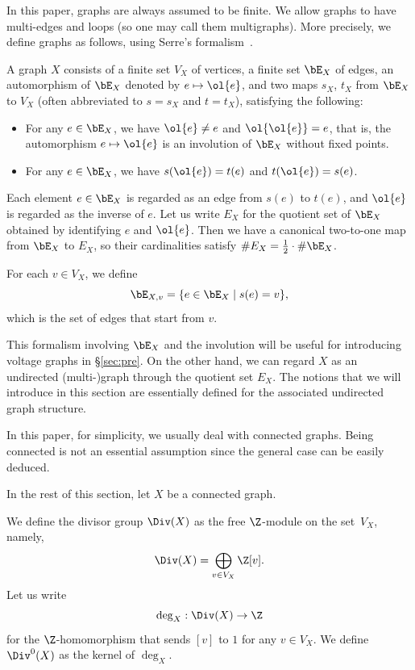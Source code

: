 In this paper, graphs are always assumed to be finite.
We allow graphs to have multi-edges and loops (so one may call them multigraphs).
More precisely, we define graphs as follows, using Serre's formalism~\cite[Chapter I, \S 2.1]{Ser80}.

\begin{defi}
A graph $X$ consists of a finite set $V_X$ of vertices, a finite set $\bE_X$ of edges, an automorphism of $\bE_X$ denoted by $e \mapsto \ol{e}$, and two maps $s_X$, $t_X$ from $\bE_X$ to $V_X$ (often abbreviated to $s = s_X$ and $t = t_X$), satisfying the following:
\begin{itemize}
\item
For any $e \in \bE_X$, we have $\ol{e} \neq e$ and $\ol{\ol{e}} = e$, that is, the automorphism $e \mapsto \ol{e}$ is an involution of $\bE_X$ without fixed points.
\item
For any $e \in \bE_X$, we have $s(\ol{e}) = t(e)$ and $t(\ol{e}) = s(e)$.
\end{itemize}

Each element $e \in \bE_X$ is regarded as an edge from $s(e)$ to $t(e)$, and $\ol{e}$ is regarded as the inverse of $e$.
Let us write $E_X$ for the quotient set of $\bE_X$ obtained by identifying $e$ and $\ol{e}$.
Then we have a canonical two-to-one map from $\bE_X$ to $E_X$, so their cardinalities satisfy $\# E_X = \frac{1}{2} \cdot \# \bE_X$.

For each $v \in V_X$, we define
\[
\bE_{X, v} = \{ e \in \bE_X \mid s(e) = v\},
\]
which is the set of edges that start from $v$.
\end{defi}

This formalism involving $\bE_X$ and the involution will be useful for introducing voltage graphs in \S\ref{sec:pre}.
On the other hand, we can regard $X$ as an undirected \mbox{(multi-)}graph through the quotient set $E_X$.
The notions that we will introduce in this section are essentially defined for the associated undirected graph structure.


In this paper, for simplicity, we usually deal with connected graphs.
Being connected is not an essential assumption since the general case can be easily deduced.

In the rest of this section, let $X$ be a connected graph.

\begin{defi}
We define the divisor group $\Div(X)$ as the free $\Z$-module on the set~$V_X$, namely, 
\[
\Div(X) = \bigoplus_{v \in V_X} \Z [v].
\]
Let us write
\[
\deg_X: \Div(X) \to \Z
\]
for the $\Z$-homomorphism that sends $[v]$ to $1$ for any $v \in V_X$.
We define $\Div^0(X)$ as the kernel of $\deg_X$.
\end{defi}

